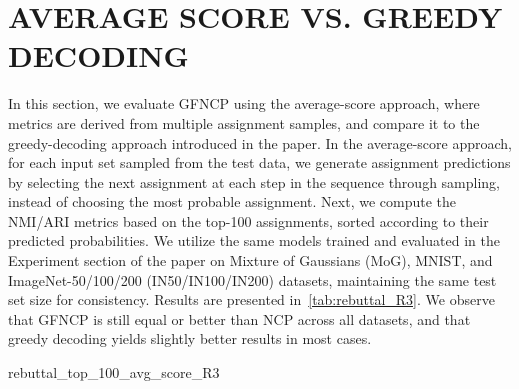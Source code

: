 
\section{AVERAGE SCORE VS. GREEDY DECODING}
\label{sec:average_score}

In this section, we evaluate GFNCP using the average-score approach, where metrics are derived from multiple assignment samples, and compare it to the greedy-decoding approach introduced in the paper.
%
In the average-score approach, for each input set sampled from the test data, we generate 
assignment predictions by selecting the next assignment at each step in the sequence through sampling, instead of choosing the most probable assignment. Next, we compute the NMI/ARI metrics based on the top-100 assignments, sorted according to their predicted probabilities. We utilize the same models trained and evaluated in the Experiment section of the paper on Mixture of Gaussians (MoG), MNIST, and ImageNet-50/100/200 (IN50/IN100/IN200) datasets, maintaining the same test set size for consistency. Results are presented in~\autoref{tab:rebuttal_R3}. We observe that GFNCP is still equal or better than NCP across all datasets, and that greedy decoding yields slightly better results in most cases.

{rebuttal_top_100_avg_score_R3}